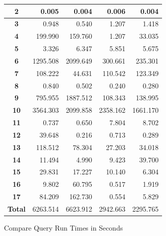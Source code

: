 \documentclass[a4paper]{article}
\begin{document}
\begin{figure}[h]
\begin{minipage}{0.5\linewidth}
\begin{tiny}
\begin{tabular}{|c|r|r|r|r|}
        \hline
        \textbf{2}     &      0.005   &      0.004   &      0.006   &      0.004\\
        \hline
        \textbf{3}     &      0.948   &      0.540   &      1.207   &      1.418\\
        \hline
        \textbf{4}     &    199.990   &    159.760   &      1.207   &     33.035\\
        \hline
        \textbf{5}     &      3.326   &      6.347   &      5.851   &      5.675\\
        \hline
        \textbf{6}     &   1295.508   &   2099.649   &    300.661   &    235.301\\
        \hline
        \textbf{7}     &    108.222   &     44.631   &    110.542   &    123.349\\
        \hline
        \textbf{8}     &      0.840   &      0.502   &      0.240   &      0.280\\
        \hline
        \textbf{9}     &    795.955   &   1887.512   &    108.343   &    138.995\\
        \hline
        \textbf{10}    &   3564.303   &   2099.858   &   2358.162   &   1661.170\\
        \hline
        \textbf{11}    &      0.737   &      0.650   &      7.804   &      8.702\\
        \hline
        \textbf{12}    &     39.648   &      0.216   &      0.713   &      0.289\\
        \hline
        \textbf{13}    &    118.512   &    78.304    &     27.203   &     34.018\\
        \hline
        \textbf{14}    &     11.494   &     4.990    &      9.423   &     39.700\\
        \hline
        \textbf{15}    &     29.831   &    17.227    &     10.140   &      6.304\\
        \hline
        \textbf{16}    &      9.802   &    60.795    &      0.517   &      1.919\\
        \hline
        \textbf{17}    &     84.209   &   162.730    &      0.554   &      5.829\\
        \hline
        \textbf{Total} &   6263.514   &  6623.912    &   2942.663   &   2295.765\\
        \hline
      \end{tabular}
    \end{tiny}
  \end{minipage}
 \caption{Compare Query Run Times in Seconds}
 \label{fig:compruntimes}
\end{figure}
\end{document}
